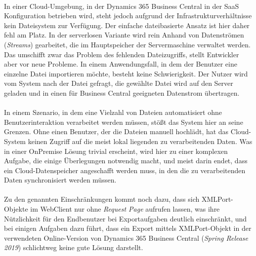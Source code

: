 \paragraph{}
In einer Cloud-Umgebung, in der Dynamics 365 Business Central in der SaaS Konfiguration betrieben wird, steht jedoch aufgrund der Infrastrukturverhältnisse kein Dateisystem zur Verfügung. Der einfache dateibasierte Ansatz ist hier daher fehl am Platz. In der serverlosen Variante wird rein Anhand von Datenströmen (\textit{Streams}) gearbeitet, die im Hauptspeicher der Servermaschine verwaltet werden. 
Das umschifft zwar das Problem des fehlenden Dateizugriffs, stellt Entwickler aber vor neue Probleme. In einem Anwendungsfall, in dem der Benutzer eine einzelne Datei importieren möchte, besteht keine Schwierigkeit. Der Nutzer wird vom System nach der Datei gefragt, die gewählte Datei wird auf den Server geladen und in einen für Business Central geeigneten Datenstrom übertragen. 

\paragraph{}
In einem Szenario, in dem eine Vielzahl von Dateien automatisiert ohne Benutzerinteraktion verarbeitet werden müssen, stößt das System hier an seine Grenzen. Ohne einen Benutzer, der die Dateien manuell hochlädt, hat das Cloud-System keinen Zugriff auf die meist lokal liegenden zu verarbeitenden Daten. Was in einer OnPremise Lösung trivial erscheint, wird hier zu einer komplexen Aufgabe, die einige Überlegungen notwendig macht, und meist darin endet, dass ein Cloud-Datenspeicher angeschafft werden muss, in den die zu verarbeitenden Daten synchronisiert werden müssen. 

\paragraph{}
Zu den genannten Einschränkungen kommt noch dazu, dass sich XMLPort-Objekte im WebClient nur ohne \textit{Request Page} aufrufen lassen, was ihre Nützlichkeit für den Endbenutzer bei Exportaufgaben deutlich einschränkt, und bei einigen Aufgaben dazu führt, dass ein Export mittels XMLPort-Objekt in der verwendeten Online-Version von Dynamics 365 Business Central (\textit{Spring Release 2019}) schlichtweg keine gute Lösung darstellt.
\pagebreak

